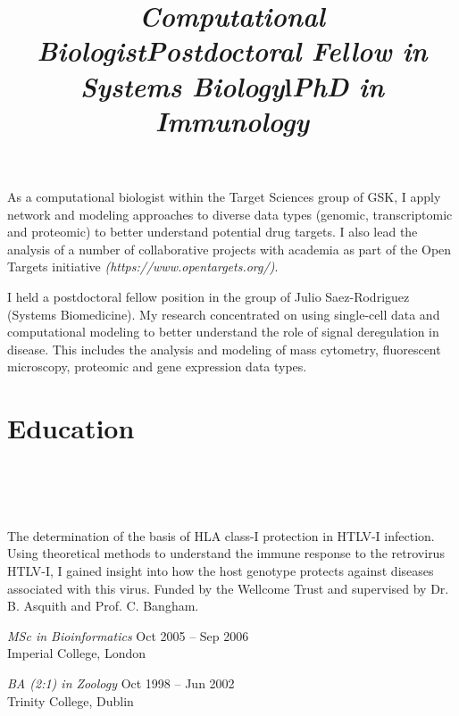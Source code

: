 \documentclass[overlapped, line, 11pt, letterpaper]{res}
\begin{document}
\begin{resume}
\title{\it Computational Biologist} 
\begin{position}
As a computational biologist within the Target Sciences group of GSK, I apply network and modeling approaches to diverse data types (genomic, transcriptomic and proteomic) to better understand potential drug targets. I also lead the analysis of a number of collaborative projects with academia as part of the Open Targets initiative \emph{(https://www.opentargets.org/)}. 
\end{position}

\title{\it Postdoctoral Fellow in Systems Biology} 
\begin{position}
I held a postdoctoral fellow position in the group of Julio Saez-Rodriguez (Systems Biomedicine). My research concentrated on using single-cell data and computational modeling to better understand the role of signal deregulation in disease. This includes the analysis and modeling of mass cytometry, fluorescent microscopy, proteomic and gene expression data types.
\end{position}

\section{\bf Education}
\begin{formatb}
\title{l} \\
\\
\body \\
\end{formatb}

\title{\it PhD in Immunology} 
\begin{position}
The determination of the basis of HLA class-I protection in HTLV-I infection. Using theoretical methods to understand the immune response to the retrovirus HTLV-I, I gained insight into how the host genotype protects against diseases associated with this virus. Funded by the Wellcome Trust and supervised by Dr. B. Asquith and Prof. C. Bangham.
\end{position}

\emph{MSc in Bioinformatics} \hfill Oct 2005 -- Sep 2006\\
Imperial College, London
 
\emph{BA (2:1) in Zoology} \hfill Oct 1998 -- Jun 2002\\
Trinity College, Dublin


\end{resume}
\end{document}
